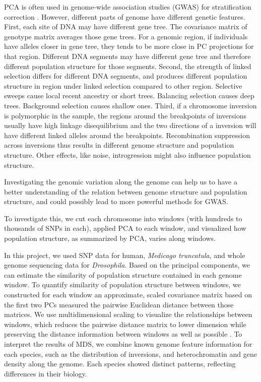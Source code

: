 \documentclass[11pt, oneside]{article}   	%
\begin{document}
PCA is often used in genome-wide association studies (GWAS) for stratification correction \citep{price2006principal}. 
However, different parts of genome have different genetic features. 
First, each site of DNA may have different gene tree. 
The covariance matrix of genotype matrix averages those gene trees. 
For a genomic region, if individuals have alleles closer in gene tree, they tends to be more close in PC projections for that region. 
Different DNA segments may have different gene tree and therefore different population structure for those segments. 
Second, the strength of linked selection differs for different DNA segments, and produces different population structure in region under linked selection compared to other region. 
Selective sweeps cause local recent ancestry or short trees.
Balancing selection causes deep trees.
Background selection causes shallow ones.
Third, if a chromosome inversion is polymorphic in the sample, the regions around the breakpoints of inversions usually have high linkage disequilibrium and the two directions of a inversion will have different linked alleles around the breakpoints. Recombination suppression across inversions thus results in different genome structure and population structure. 
Other effects, like noise, introgression might also influence population structure.

Investigating the genomic variation along the genome can help us to have a better understanding of the relation between genome structure and population structure, and could possibly lead to more powerful methods for GWAS.

To investigate this, we cut each chromosome into windows (with hundreds to thousands of SNPs in each), applied PCA to each window, and visualized how population structure, as summarized by PCA, varies along windows.

In this project, we used SNP data for human, \textit{Medicago truncatula}, and whole genome sequencing data for \textit{Drosophila}.
Based on the principal components, we can estimate the similarity of population structure contained in each genome window. 
To quantify similarity of population structure between windows, we constructed for each window an approximate, scaled covariance matrix based on the first two PCs measured the pairwise Euclidean distance between those matrices.
We use multidimensional scaling to visualize the relationships between windows, which reduces the pairwise distance matrix to lower dimension while preserving the distance information between windows as well as possible \citep{borg2005modern}. 
To interpret the results of MDS, we combine known genome feature information for each species, such as the distribution of inversions, and heterochromatin and gene density along the genome. Each species showed distinct patterns, reflecting differences in their biology. 
\end{document}
